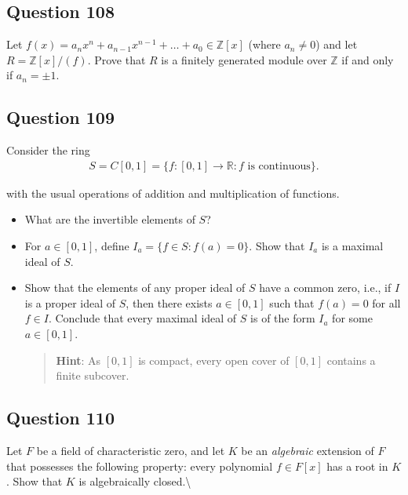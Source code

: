 \documentclass[12pt]{article}
\begin{document}
\hypertarget{question-108}{%
\subsection{Question 108}\label{question-108}}

Let \(f(x)=a_nx^n+a_{n-1}x^{n-1}+\dots+a_0\in\mathbb Z[x]\) (where
\(a_n\neq 0\)) and let \(R=\mathbb Z[x]/(f)\). Prove that \(R\) is a
finitely generated module over \(\mathbb Z\) if and only if
\(a_n=\pm 1\).

\hypertarget{question-109}{%
\subsection{Question 109}\label{question-109}}

Consider the ring \begin{align*}
S=C[0,1]=\{f:[0,1]\rightarrow\mathbb R:f\text{ is continuous}\}
.\end{align*}

with the usual operations of addition and multiplication of functions.

\begin{itemize}
\item
  What are the invertible elements of \(S\)?
\item
  For \(a\in[0,1]\), define \(I_a=\{f\in S:f(a)=0\}\). Show that \(I_a\)
  is a maximal ideal of \(S\).
\item
  Show that the elements of any proper ideal of \(S\) have a common
  zero, i.e., if \(I\) is a proper ideal of \(S\), then there exists
  \(a\in[0,1]\) such that \(f(a)=0\) for all \(f\in I\). Conclude that
  every maximal ideal of \(S\) is of the form \(I_a\) for some
  \(a\in[0,1]\).

  \begin{quote}
  \textbf{Hint}: As \([0,1]\) is compact, every open cover of \([0,1]\)
  contains a finite subcover.
  \end{quote}
\end{itemize}

\hypertarget{question-110}{%
\subsection{Question 110}\label{question-110}}

Let \(F\) be a field of characteristic zero, and let \(K\) be an
\emph{algebraic} extension of \(F\) that possesses the following
property: every polynomial \(f\in F[x]\) has a root in \(K\). Show that
\(K\) is algebraically closed.\textbackslash{}
\end{document}
